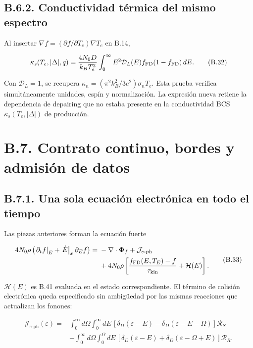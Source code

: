 \documentclass[
  spanish,
  10pt,
  a4paper,
]{article}
\newcounter{none} %
\begin{document}
\subsection{B.6.2. Conductividad térmica del mismo
espectro}\label{b.6.2.-conductividad-tuxe9rmica-del-mismo-espectro}

Al insertar \(\nabla f=(\partial f/\partial T_e)\nabla T_e\) en B.14,

\[
\kappa_s(T_e,|\Delta|,q)=\frac{4N_0D}{k_BT_e^2}
\int_0^\infty E^2\mathcal D_L(E)
 f_{\rm FD}(1-f_{\rm FD})\,dE. \tag{B.32}
\]

Con \(\mathcal D_L=1\), se recupera
\(\kappa_n=(\pi^2k_B^2/3e^2)\sigma_nT_e\). Esta prueba verifica
simultáneamente unidades, espín y normalización. La expresión nueva
retiene la dependencia de depairing que no estaba presente en la
conductividad BCS \(\kappa_s(T_e,|\Delta|)\) de producción.

\section{B.7. Contrato continuo, bordes y admisión de
datos}\label{b.7.-contrato-continuo-bordes-y-admisiuxf3n-de-datos}

\subsection{B.7.1. Una sola ecuación electrónica en todo el
tiempo}\label{b.7.1.-una-sola-ecuaciuxf3n-electruxf3nica-en-todo-el-tiempo}

Las piezas anteriores forman la ecuación fuerte

\[
\begin{aligned}
4N_0\rho\left(\left.\partial_tf\right|_E
+\left.\dot E\right|_x\partial_Ef\right)
={}&-\nabla\cdot\boldsymbol\Phi_f+\mathcal J_{e\text{-ph}}\\
&+4N_0\rho\left[\frac{f_{\rm FD}(E,T_E)-f}{\tau_{\rm kin}}+\mathcal H(E)\right].
\end{aligned}
\tag{B.33}
\]

\(\mathcal H(E)\) es B.41 evaluada en el estado correspondiente. El
término de colisión electrónica queda especificado sin ambigüedad por
las mismas reacciones que actualizan los fonones:

\[
\begin{aligned}
\mathcal J_{e\text{-ph}}(\varepsilon)
={}&\int_0^\infty d\Omega\int_0^\infty dE\,
[\delta_D(\varepsilon-E)-\delta_D(\varepsilon-E-\Omega)]\mathcal R_S\\
&-\int_0^\infty d\Omega\int_0^\Omega dE\,
[\delta_D(\varepsilon-E)+\delta_D(\varepsilon-\Omega+E)]\mathcal R_R.
\end{aligned}
\tag{B.34}
\]
\end{document}
